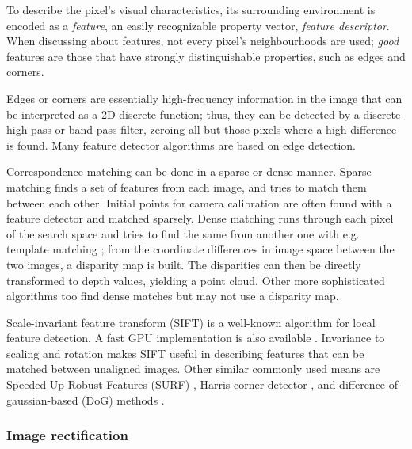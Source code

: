 
To describe the pixel's visual characteristics, its surrounding environment is encoded as a \emph{feature}, an easily recognizable property vector, \emph{feature descriptor}.
When discussing about features, not every pixel's neighbourhoods are used; \emph{good} features are those that have strongly distinguishable properties, such as edges and corners.

Edges or corners are essentially high-frequency information in the image that can be interpreted as a 2D discrete function; thus, they can be detected by a discrete high-pass or band-pass filter, zeroing all but those pixels where a high difference is found. \cite{marr1980theory}
Many feature detector algorithms are based on edge detection. %


Correspondence matching can be done in a sparse or dense manner.
Sparse matching finds a set of features from each image, and tries to match them between each other.
Initial points for camera calibration are often found with a feature detector and matched sparsely.
Dense matching runs through each pixel of the search space and tries to find the same from another one with e.g. template matching \cite{duda1973pattern}; from the coordinate differences in image space between the two images, a disparity map is built.
The disparities can then be directly transformed to depth values, yielding a point cloud.
Other more sophisticated algorithms too find dense matches but may not use a disparity map.

Scale-invariant feature transform (SIFT) \cite{lowe1999object} is a well-known algorithm for local feature detection. A fast GPU implementation is also available \cite{changchang2007siftgpu}.  Invariance to scaling and rotation makes SIFT useful in describing features that can be matched between unaligned images. Other similar commonly used means are Speeded Up Robust Features (SURF) \cite{bay2006surf}, Harris corner detector \cite{harris1988combined}, and difference-of-gaussian-based (DoG) methods \cite{dog}.



\subsubsection{Image rectification} %

